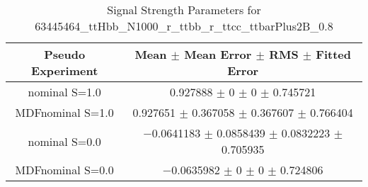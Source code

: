 \begin{table}
\centering
\caption{Signal Strength Parameters for 63445464\_ttHbb\_N1000\_r\_ttbb\_r\_ttcc\_ttbarPlus2B\_0.8}
\begin{tabular}{cc}
\toprule
Pseudo Experiment & Mean $\pm$ Mean Error $\pm$ RMS $\pm$ Fitted Error\\
\midrule
nominal S=1.0 & \num{0.927888} $\pm$ \num{0} $\pm$ \num{0} $\pm$ \num{0.745721}\\
MDFnominal S=1.0 & \num{0.927651} $\pm$ \num{0.367058} $\pm$ \num{0.367607} $\pm$ \num{0.766404}\\
nominal S=0.0 & \num{-0.0641183} $\pm$ \num{0.0858439} $\pm$ \num{0.0832223} $\pm$ \num{0.705935}\\
MDFnominal S=0.0 & \num{-0.0635982} $\pm$ \num{0} $\pm$ \num{0} $\pm$ \num{0.724806}\\
\bottomrule
\end{tabular}
\end{table}